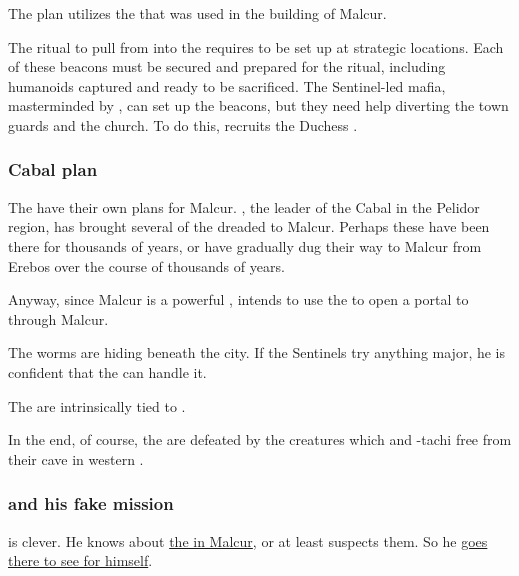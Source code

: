 \begin{garbage}
The plan utilizes the  that was used in the building of Malcur.

The ritual to pull \Nithdornazsh{} from \hs{\Machai} into the \Miith{} requires  to be set up at strategic locations. 
Each of these beacons must be secured and prepared for the ritual, including humanoids captured and ready to be sacrificed. 
The Sentinel-led mafia, masterminded by \Psyrex, can set up the beacons, but they need help diverting the town guards and the church. 
To do this, \Psyrex{} recruits the Duchess \hs{\Tiroco}. 






\subsubsection{Cabal plan}
The  have their own plans for Malcur. 
\hs\Teshrial, the leader of the Cabal in the Pelidor region, has brought several of the dreaded \hs{\ghobaleth} to Malcur. Perhaps these \ghobaleth{} have been there for thousands of years, or have gradually dug their way to Malcur from Erebos over the course of thousands of years. 

Anyway, since Malcur is a powerful \nexus, \Teshrial{} intends to use the \ghobaleth{} to open a portal to \hs{\Erebos} through Malcur. 

The worms are hiding beneath the city. If the Sentinels try anything major, he is confident that the \ghobaleth{} can handle it. 

The \ghobaleth{} are intrinsically tied to .

In the end, of course, the \ghobaleth{} are defeated by the creatures which \Ishnaruchaefir{} and \Shilred-tachi free from their cave in western \PelidorContinent. 






\subsubsection{\Ishnaruchaefir{} and his fake mission}
\Ishnaruchaefir{} is clever. He knows about \hyperref[Teshrial's creatures]{the \ghobaleth{} in Malcur}, or at least suspects them. So he \hyperref[Ishnaruchaefir attacks Teshrial's creature]{goes there to see for himself}. 


\end{garbage}
